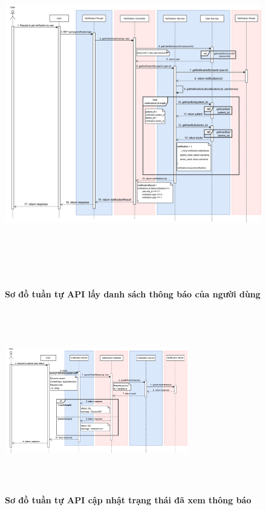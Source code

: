 \begin{figure}[H]
	\centering
	\includegraphics[width=15cm,height=15cm]{Images/api_sequence/noti/getNotificationByUserId.drawio.png}
	\caption[Sơ đồ tuần tự API lấy danh sách thông báo của người dùng]{\bfseries \fontsize{12pt}{0pt}\selectfont Sơ đồ tuần tự API lấy danh sách thông báo của người dùng}
	\label{sequence_diagram_get_notification_by_user}
\end{figure}

\begin{figure}[H]
	\centering
	\includegraphics[width=8cm,height=8cm]{Images/api_sequence/noti/updateSeenStatus.drawio.png}
	\caption[Sơ đồ tuần tự API cập nhật trạng thái đã xem thông báo]{\bfseries \fontsize{12pt}{0pt}\selectfont Sơ đồ tuần tự API cập nhật trạng thái đã xem thông báo}
	\label{sequence_diagram_update_seen}
\end{figure}


